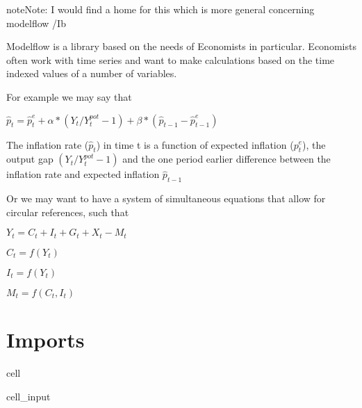 \documentclass[letterpaper,10pt,english]{jupyterBook}
\begin{document}
\begin{sphinxadmonition}{note}{Note:}
\sphinxAtStartPar
I would find a home for this which is more general concerning modelflow /Ib

\sphinxAtStartPar
Modelflow is a library based on the needs of Economists in particular. Economists often work with time series and want to make calculations based on the time indexed values of a number of variables.

\sphinxAtStartPar
For example we may say that

\sphinxAtStartPar
\(\hat p_t = \hat p^e_{t}+  \alpha * (Y_t/Y^{pot}_t -1) + \beta *  (\hat p_{t-1}- \hat p^e_{t-1})\)

\sphinxAtStartPar
The inflation rate (\(\hat p_t\)) in time t is a function of expected inflation (\(p^e_{t}\)), the output gap \((Y_t/Y^{pot}_t -1)\) and the one period earlier difference between the inflation rate and expected inflation  \(\hat p_{t-1}\)

\sphinxAtStartPar
Or we may want to have a system of simultaneous equations that allow for circular references, such that

\sphinxAtStartPar
\(Y_t = C_t +I_t +G_t +X_t - M_t\)

\sphinxAtStartPar
\(C_t= f(Y_t)\)

\sphinxAtStartPar
\(I_t= f(Y_t)\)

\sphinxAtStartPar
\(M_t= f(C_t,I_t)\)
\end{sphinxadmonition}


\section{Imports}
\label{\detokenize{content/howto/update/extending_dataframes:imports}}
\begin{sphinxuseclass}{cell}\begin{sphinxVerbatimInput}

\begin{sphinxuseclass}{cell_input}
\begin{sphinxVerbatim}[commandchars=\\\{\}]
     
        
\end{sphinxVerbatim}

\end{sphinxuseclass}\end{sphinxVerbatimInput}

\end{sphinxuseclass}
\end{document}
